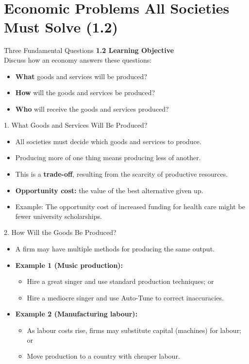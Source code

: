 \documentclass[aspectratio=169]{beamer}
\begin{document}
\section{Economic Problems All Societies Must Solve (1.2)}

\begin{frame}{Three Fundamental Questions}
\transfade
\textbf{1.2 Learning Objective}\\[0.3em]
Discuss how an economy answers these questions:
\begin{itemize}
  \item \textbf{What} goods and services will be produced?
  \item \textbf{How} will the goods and services be produced?
  \item \textbf{Who} will receive the goods and services produced?
\end{itemize}
\end{frame}

\begin{frame}{1. What Goods and Services Will Be Produced?}
\transfade
\begin{itemize}
  \item All societies must decide which goods and services to produce.
  \item Producing more of one thing means producing less of another.
  \item This is a \textbf{trade-off}, resulting from the scarcity of productive resources.
  \item \textbf{Opportunity cost:} the value of the best alternative given up.
  \item Example: The opportunity cost of increased funding for health care might be fewer university scholarships.
\end{itemize}
\end{frame}



\begin{frame}{2. How Will the Goods Be Produced?}
\transfade
\begin{itemize}
  \item A firm may have multiple methods for producing the same output.
  \item \textbf{Example 1 (Music production):}
  \begin{itemize}
    \item Hire a great singer and use standard production techniques; or
    \item Hire a mediocre singer and use Auto-Tune to correct inaccuracies.
  \end{itemize}
  \item \textbf{Example 2 (Manufacturing labour):}
  \begin{itemize}
    \item As labour costs rise, firms may substitute capital (machines) for labour; or
    \item Move production to a country with cheaper labour.
  \end{itemize}
\end{itemize}
\end{frame}
\end{document}
